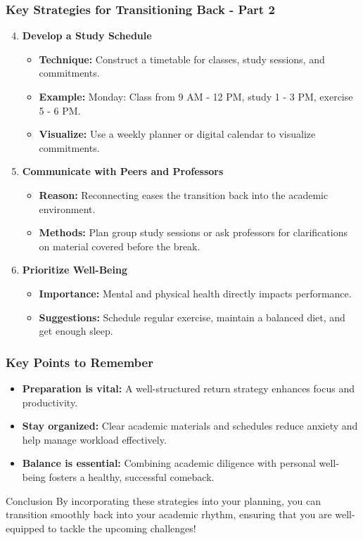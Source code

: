 \documentclass[aspectratio=169]{beamer}
\begin{document}
\begin{frame}[fragile]
    \frametitle{Key Strategies for Transitioning Back - Part 2}
    \begin{enumerate}
        \setcounter{enumi}{3}
        \item \textbf{Develop a Study Schedule}
        \begin{itemize}
            \item \textbf{Technique:} Construct a timetable for classes, study sessions, and commitments.
            \item \textbf{Example:} Monday: Class from 9 AM - 12 PM, study 1 - 3 PM, exercise 5 - 6 PM.
            \item \textbf{Visualize:} Use a weekly planner or digital calendar to visualize commitments.
        \end{itemize}

        \item \textbf{Communicate with Peers and Professors}
        \begin{itemize}
            \item \textbf{Reason:} Reconnecting eases the transition back into the academic environment.
            \item \textbf{Methods:} Plan group study sessions or ask professors for clarifications on material covered before the break.
        \end{itemize}

        \item \textbf{Prioritize Well-Being}
        \begin{itemize}
            \item \textbf{Importance:} Mental and physical health directly impacts performance.
            \item \textbf{Suggestions:} Schedule regular exercise, maintain a balanced diet, and get enough sleep.
        \end{itemize}
    \end{enumerate}
\end{frame}

\begin{frame}[fragile]
    \frametitle{Key Points to Remember}
    \begin{itemize}
        \item \textbf{Preparation is vital:} A well-structured return strategy enhances focus and productivity.
        \item \textbf{Stay organized:} Clear academic materials and schedules reduce anxiety and help manage workload effectively.
        \item \textbf{Balance is essential:} Combining academic diligence with personal well-being fosters a healthy, successful comeback.
    \end{itemize}
    
    \begin{block}{Conclusion}
        By incorporating these strategies into your planning, you can transition smoothly back into your academic rhythm, ensuring that you are well-equipped to tackle the upcoming challenges!
    \end{block}
\end{frame}
\end{document}
